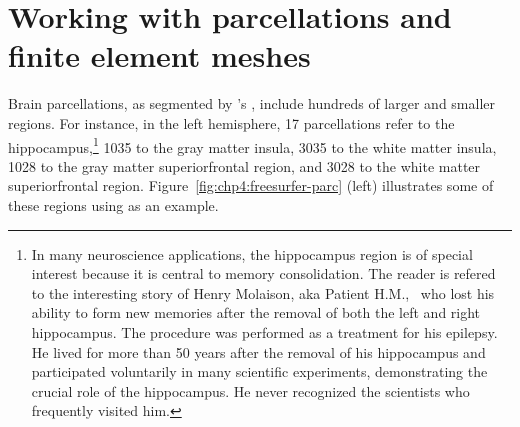 \section{Working with parcellations and finite element meshes} 
\label{sec:import-freesurfer-parcellation}
Brain parcellations, as segmented by {\freesurfer}'s ,
include hundreds of larger and smaller regions. For instance, in the
left hemisphere, 17 parcellations refer to the hippocampus,\footnote{In many
  neuroscience applications, the hippocampus region is of special
  interest because it is central to memory consolidation. The reader
  is refered to the interesting story of Henry Molaison, aka Patient
  H.M.,~\cite{squire2009legacy, scoville1957loss} who lost his ability
  to form new memories after the removal of both the left and right
  hippocampus. The procedure was performed as a treatment for his
  epilepsy. He lived for more than 50 years after the removal of his
  hippocampus and participated voluntarily in many scientific
  experiments, demonstrating the crucial role of the hippocampus. He
  never recognized the scientists who frequently visited him.} 1035
to the gray matter insula, 3035 to the white matter insula, 1028 to
the gray matter superiorfrontal region, and 3028 to the white matter
superiorfrontal region. Figure~\ref{fig:chp4:freesurfer-parc} (left) illustrates 
some of these regions using  as an example. 
%
%
